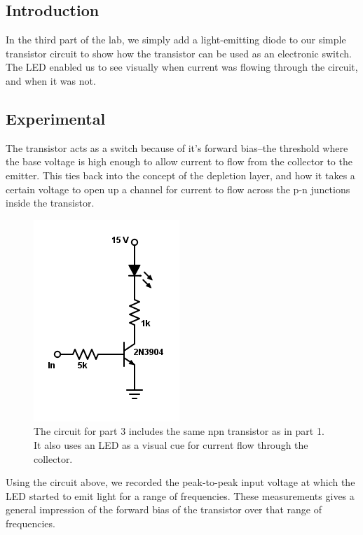 \documentclass[11pt]{article}
\begin{document}
\subsection{Introduction}

In the third part of the lab, we simply add a light-emitting diode to our simple transistor circuit to show how the transistor can be used as an electronic switch. The LED enabled us to see visually when current was flowing through the circuit, and when it was not.\\

\subsection{Experimental}

The transistor acts as a switch because of it's forward bias--the threshold where the base voltage is high enough to allow current to flow from the collector to the emitter. This ties back into the concept of the depletion layer, and how it takes a certain voltage to open up a channel for current to flow across the p-n junctions inside the transistor.\\

\begin{figure}[H]
    \centering
    \includegraphics[scale=0.4]{Diagrams/c-3.png}
    \caption{The circuit for part 3 includes the same npn transistor as in part 1. It also uses an LED as a visual cue for current flow through the collector.}
    \label{circuit:3}
\end{figure}

Using the circuit above, we recorded the peak-to-peak input voltage at which the LED started to emit light for a range of frequencies. These measurements gives a general impression of the forward bias of the transistor over that range of frequencies.\\
\end{document}
